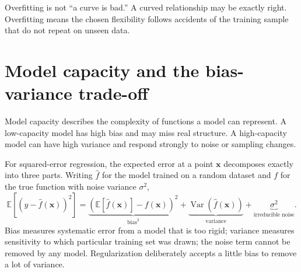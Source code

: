 \begin{keyidea}
Overfitting is not ``a curve is bad.'' A curved relationship may be exactly right. Overfitting means the chosen flexibility follows accidents of the training sample that do not repeat on unseen data.
\end{keyidea}

\section{Model capacity and the bias-variance trade-off}\label{sec:bias-variance}

Model capacity describes the complexity of functions a model can represent. A low-capacity model has high bias and may miss real structure. A high-capacity model can have high variance and respond strongly to noise or sampling changes.

For squared-error regression, the expected error at a point $\bm{x}$ decomposes exactly into three parts. Writing $\hat{f}$ for the model trained on a random dataset and $f$ for the true function with noise variance $\sigma^2$,
\[
  \mathbb{E}\!\left[{(y-\hat{f}(\bm{x}))}^2\right]
  =\underbrace{{\left(\mathbb{E}[\hat{f}(\bm{x})]-f(\bm{x})\right)}^2}_{\text{bias}^2}
  +\underbrace{\operatorname{Var}\!\left(\hat{f}(\bm{x})\right)}_{\text{variance}}
  +\underbrace{\sigma^2}_{\text{irreducible noise}}.
\]
Bias measures systematic error from a model that is too rigid; variance measures sensitivity to which particular training set was drawn; the noise term cannot be removed by any model. Regularization deliberately accepts a little bias to remove a lot of variance.

